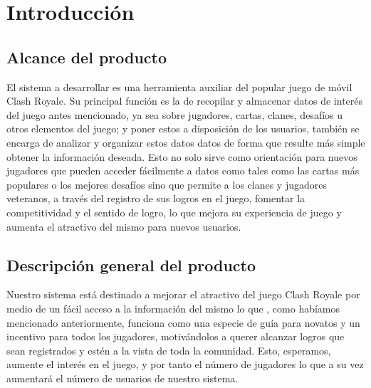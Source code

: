 %
%
%
%
\section{Introducción}

\subsection{Alcance del producto}

El sistema a desarrollar es una herramienta auxiliar del popular juego de móvil Clash Royale. Su principal función es la de recopilar y almacenar datos de interés del juego antes mencionado, ya sea sobre jugadores, cartas, clanes, desafíos u otros elementos del juego; y poner estos a disposición de los usuarios, también se encarga de analizar y organizar estos datos datos de forma que resulte más simple obtener la información deseada. Esto no solo sirve como orientación para nuevos jugadores que pueden acceder fácilmente a datos como tales como las cartas más populares o los mejores desafíos sino que permite a los clanes y jugadores veteranos, a través del registro de sus logros en el juego, fomentar la competitividad y el sentido de logro, lo que mejora su experiencia de juego y aumenta el atractivo del mismo para nuevos usuarios.

\subsection{Descripción general del producto}

Nuestro sistema está destinado a mejorar el atractivo del juego Clash Royale por medio de un fácil acceso a la información del mismo lo que , como habíamos mencionado anteriormente, funciona como una especie de guía para novatos y un incentivo para todos los jugadores, motivándolos a querer alcanzar logros que sean registrados y estén a la vista de toda la comunidad. Esto, esperamos, aumente el interés en  el juego, y por tanto el número de jugadores lo que a su vez aumentará el número de usuarios de nuestro sistema. 

